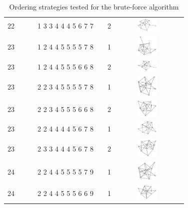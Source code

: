 \begin{table}[h!]
\begin{tabular}{m{0.15\linewidth} m{0.35\linewidth} m{0.15\linewidth} m{0.25\linewidth}}
22 & 1 3 3 4 4 4 5 6 7 7 & 2 & \includegraphics[width=1cm]{15-universal-graphs/img/degree-sequences-example-graphs/graph-5-10-7} \\
23 & 1 2 4 4 5 5 5 5 7 8 & 1 & \includegraphics[width=1cm]{15-universal-graphs/img/degree-sequences-example-graphs/graph-5-10-8} \\
23 & 1 2 4 4 5 5 5 6 6 8 & 2 & \includegraphics[width=1cm]{15-universal-graphs/img/degree-sequences-example-graphs/graph-5-10-9} \\
23 & 2 2 3 4 5 5 5 5 7 8 & 1 & \includegraphics[width=1cm]{15-universal-graphs/img/degree-sequences-example-graphs/graph-5-10-10} \\
23 & 2 2 3 4 5 5 5 6 6 8 & 2 & \includegraphics[width=1cm]{15-universal-graphs/img/degree-sequences-example-graphs/graph-5-10-11} \\
23 & 2 2 4 4 4 4 5 6 7 8 & 1 & \includegraphics[width=1cm]{15-universal-graphs/img/degree-sequences-example-graphs/graph-5-10-12} \\
23 & 2 3 3 4 4 4 5 6 7 8 & 2 & \includegraphics[width=1cm]{15-universal-graphs/img/degree-sequences-example-graphs/graph-5-10-13} \\
24 & 2 2 4 4 5 5 5 5 7 9 & 1 & \includegraphics[width=1cm]{15-universal-graphs/img/degree-sequences-example-graphs/graph-5-10-14} \\
24 & 2 2 4 4 5 5 5 6 6 9 & 1 & \includegraphics[width=1cm]{15-universal-graphs/img/degree-sequences-example-graphs/graph-5-10-15} \\
\bottomrule
\end{tabular}
\caption{Ordering strategies tested for the brute-force algorithm}
\label{tab:TODO}
\end{table}

